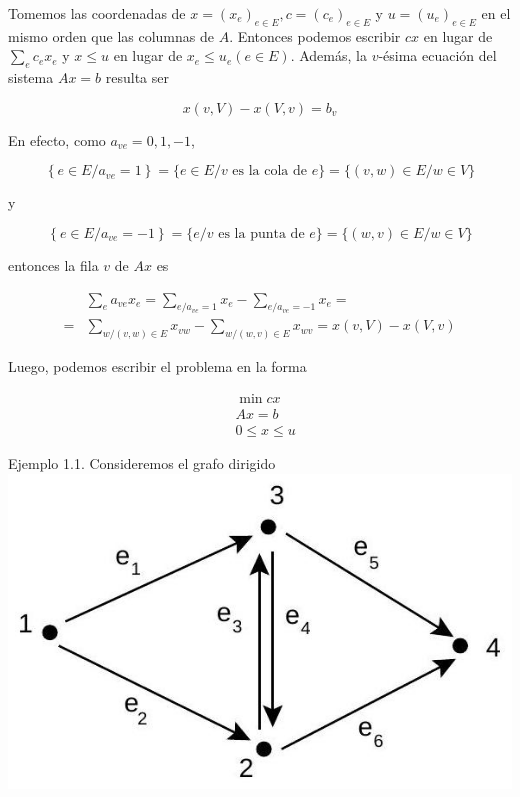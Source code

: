\documentclass[10pt]{article}
\begin{document}
Tomemos las coordenadas de $x=\left(x_{e}\right)_{e \in E}, c=\left(c_{e}\right)_{e \in E}$ y $u=\left(u_{e}\right)_{e \in E}$ en el mismo orden que las columnas de $A$. Entonces podemos escribir $c x$ en lugar de $\sum_{e} c_{e} x_{e}$ y $x \leq u$ en lugar de $x_{e} \leq u_{e}(e \in E)$. Además, la $v$-ésima ecuación del sistema $A x=b$ resulta ser

$$
x(v, V)-x(V, v)=b_{v}
$$

En efecto, como $a_{v e}=0,1,-1$,

$$
\left\{e \in E / a_{v e}=1\right\}=\{e \in E / v \text { es la cola de } e\}=\{(v, w) \in E / w \in V\}
$$

y

$$
\left\{e \in E / a_{v e}=-1\right\}=\{e / v \text { es la punta de } e\}=\{(w, v) \in E / w \in V\}
$$

entonces la fila $v$ de $A x$ es

$$
\begin{aligned}
& \sum_{e} a_{v e} x_{e}=\sum_{e / a_{v e}=1} x_{e}-\sum_{e / a_{v e}=-1} x_{e}= \\
= & \sum_{w /(v, w) \in E} x_{v w}-\sum_{w /(w, v) \in E} x_{w v}=x(v, V)-x(V, v)
\end{aligned}
$$

Luego, podemos escribir el problema en la forma

$$
\begin{aligned}
& \min c x \\
& A x=b \\
& 0 \leq x \leq u
\end{aligned}
$$

Ejemplo 1.1. Consideremos el grafo dirigido\\
\includegraphics[max width=\textwidth, center]{2025_09_05_955b52bfc43174a24a9ag-02}
\end{document}
